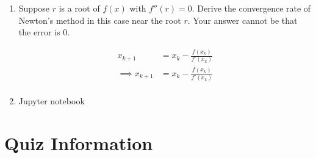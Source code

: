 \documentclass[reqno]{exam}
\begin{document}
\begin{enumerate}
\begin{solution}
At $x_1 = \begin{bmatrix} -2 \\ 1 \end{bmatrix}$:
$$f(x_1) = \begin{bmatrix} -2 \\ 3 \end{bmatrix}, \quad J_f(x_1) = \begin{bmatrix} 1 & 0 \\ -3 & 2 \end{bmatrix}$$

Solve $J_f(x_1) \Delta x = -f(x_1) = \begin{bmatrix} 2 \\ -3 \end{bmatrix}$:

From row 1: $\Delta x_1 = 2$. From row 2: $\Delta x_2 = \frac{3}{2}$.

Therefore:
$$\boxed{x_2 = \begin{bmatrix} -2 \\ 1 \end{bmatrix} + \begin{bmatrix} 2 \\ 3/2 \end{bmatrix} = \begin{bmatrix} 0 \\ 5/2 \end{bmatrix}}$$
\end{solution}

\item Suppose $r$ is a root of $f(x)$ with $f''(r) = 0$. Derive the convergence rate of Newton's method in this case near the root $r$. Your answer cannot be that the error is 0.

\begin{solution}
\begin{align*}
    x_{k+1} &= x_k - \frac{f(x_k)}{f'(x_k)} \\
    \implies 
    x_{k+1} &= x_k - \frac{f(x_k)}{f'(x_k)} \\
\end{align*}

\end{solution}

\item Jupyter notebook

\end{enumerate}



\section*{Quiz Information}
\end{document}
